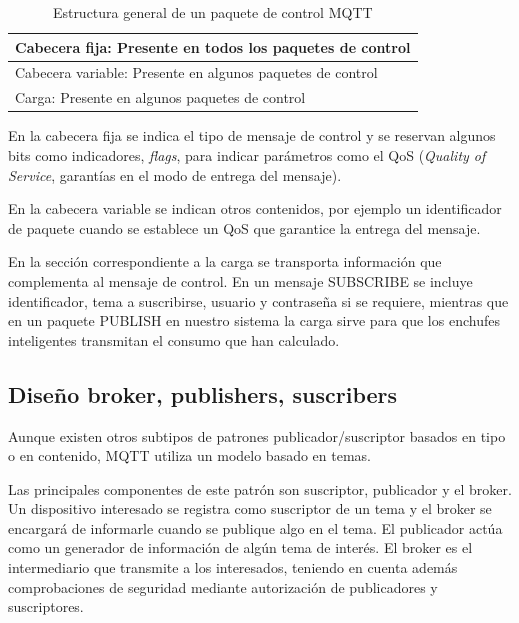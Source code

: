 \documentclass[a4paper,10pt]{article}
\begin{document}
\begin{table}[H]
  \centering
  \begin{tabular}{|l|}
    \hline
    Cabecera fija: Presente en todos los paquetes de control   \\ \hline
    Cabecera variable: Presente en algunos paquetes de control \\ \hline
    Carga: Presente en algunos paquetes de control             \\ \hline
  \end{tabular}
  \caption{Estructura general de un paquete de control MQTT}\label{table:cabecera-mqtt}
\end{table}

En la cabecera fija se indica el tipo de mensaje de control y se
reservan algunos bits como indicadores, \textit{flags}, para indicar
parámetros como el QoS (\textit{Quality of Service}, garantías en el
modo de entrega del mensaje).

En la cabecera variable se indican otros contenidos, por ejemplo un
identificador de paquete cuando se establece un QoS que garantice la
entrega del mensaje.

En la sección correspondiente a la carga se transporta información que
complementa al mensaje de control. En un mensaje SUBSCRIBE se incluye
identificador, tema a suscribirse, usuario y contraseña si se
requiere, mientras que en un paquete PUBLISH en nuestro sistema
la carga sirve para que los enchufes inteligentes transmitan el
consumo que han calculado.

\newpage

\subsection{Diseño broker, publishers,
suscribers}\label{diseuxf1o-broker-publishers-suscribers}

Aunque existen otros subtipos de patrones publicador/suscriptor
basados en tipo o en contenido\cite{p.th.eugsterManyFacesPublish},
MQTT utiliza un modelo basado en temas.

Las principales componentes de este patrón son suscriptor, publicador
y el broker. Un dispositivo interesado se registra como suscriptor de
un tema y el broker se encargará de informarle cuando se publique algo
en el tema. El publicador actúa como un generador de información de
algún tema de interés. El broker es el intermediario que transmite a
los interesados, teniendo en cuenta además comprobaciones de seguridad
mediante autorización de publicadores y
suscriptores.\cite{al-fuqahaInternetThingsSurvey2015,hunkelerMQTTSPublishSubscribe2008}
\end{document}
